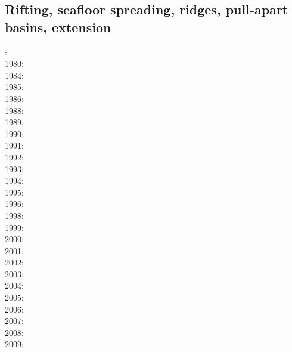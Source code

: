 \subsection*{Rifting, seafloor spreading, ridges, pull-apart basins, extension}
  

: \cite{froi73}\\
1980: \cite{bran80}\\
1984: \cite{poay84}\\
1985: \cite{bosw85}\\
1986: \cite{hoen86b}\cite{zupf86}\cite{zupa86}\cite{mofr86}\\
1988: \cite{bums88}\\
1989: \cite{mewi89}\cite{brbe89}\\
1990: \cite{fara90}\cite{lipa90}\\
1991: \cite{trbr91}\cite{buck91}\\
1992: \cite{zieg92b}\cite{egan92}\\
1993: \cite{gowo93}\\
1994: \cite{trca94}\\
1995: \cite{gowo95}\cite{katl95}\\
1996: \cite{dusa96}\cite{beda96}\cite{mada96}\\
1998: \cite{rafm98}\\
1999: \cite{brun99}\cite{bulp99}\cite{gowo99}\\
2000: \cite{scth00}\\
2001: \cite{hupc01}\cite{hupc01b}\cite{frbr01}\cite{frnb01a}\cite{frnb01b}\\
2002: \cite{hube02}\cite{hani02}\cite{dabm02}\cite{vacl02}\cite{belz02}\cite{hupc02}
      \cite{hube02b}\\
2003: \cite{hube03}\cite{hani03}\cite{covb03}\cite{wibm03}\\
2004: \cite{hier04}\\
2005: \cite{hubb05}\cite{coub05}\cite{vanw05}\cite{vabl05}\\
2006: \cite{tibs06}\cite{coma06}\cite{crwy06}\cite{peso06}\\
2007: \cite{huha07}\cite{macl07}\cite{vabl07}\cite{dyrm07}\cite{hube07}\cite{buto07}\\
2008: \cite{cort08}\cite{gumb08}\cite{buhb08}\cite{hube08}\cite{peso08}\\
2009: \cite{agcz09}\cite{kekj09}\cite{sihb09}\\
